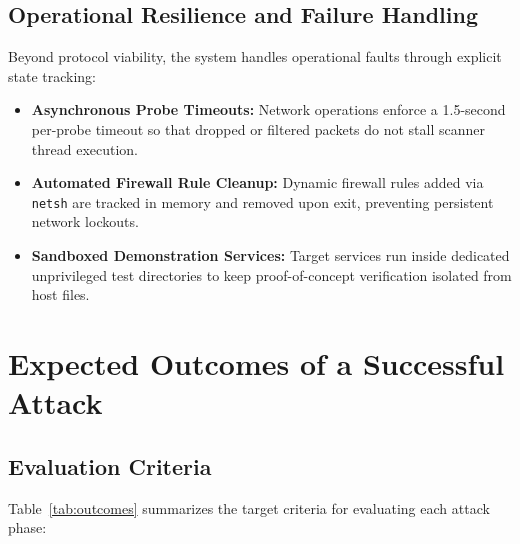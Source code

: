 \documentclass[11pt,a4paper]{article}
\begin{document}
\subsection{Operational Resilience and Failure Handling}
Beyond protocol viability, the system handles operational faults through explicit state tracking:
\begin{itemize}[nosep, itemsep=3pt, leftmargin=1.4em]
    \item \textbf{Asynchronous Probe Timeouts:} Network operations enforce a 1.5-second per-probe timeout so that dropped or filtered packets do not stall scanner thread execution.
    \item \textbf{Automated Firewall Rule Cleanup:} Dynamic firewall rules added via \texttt{netsh} are tracked in memory and removed upon exit, preventing persistent network lockouts.
    \item \textbf{Sandboxed Demonstration Services:} Target services run inside dedicated unprivileged test directories to keep proof-of-concept verification isolated from host files.
\end{itemize}

\section{Expected Outcomes of a Successful Attack}

\subsection{Evaluation Criteria}
Table~\ref{tab:outcomes} summarizes the target criteria for evaluating each attack phase:
\end{document}

